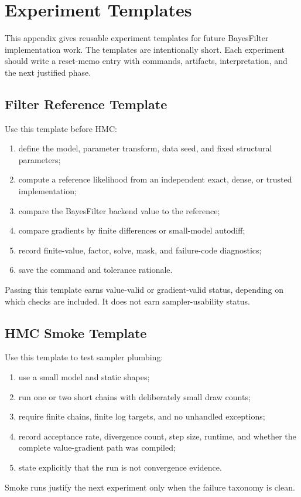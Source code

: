 \chapter{Experiment Templates}
\label{app:bf-experiment-templates}

This appendix gives reusable experiment templates for future BayesFilter
implementation work.  The templates are intentionally short.  Each experiment
should write a reset-memo entry with commands, artifacts, interpretation, and
the next justified phase.

\section{Filter Reference Template}
\label{sec:bf-filter-reference-template}

Use this template before HMC:
\begin{enumerate}[label=(\roman*)]
  \item define the model, parameter transform, data seed, and fixed structural
    parameters;
  \item compute a reference likelihood from an independent exact, dense, or
    trusted implementation;
  \item compare the BayesFilter backend value to the reference;
  \item compare gradients by finite differences or small-model autodiff;
  \item record finite-value, factor, solve, mask, and failure-code diagnostics;
  \item save the command and tolerance rationale.
\end{enumerate}
Passing this template earns value-valid or gradient-valid status, depending on
which checks are included.  It does not earn sampler-usability status.

\section{HMC Smoke Template}
\label{sec:bf-hmc-smoke-template}

Use this template to test sampler plumbing:
\begin{enumerate}[label=(\roman*)]
  \item use a small model and static shapes;
  \item run one or two short chains with deliberately small draw counts;
  \item require finite chains, finite log targets, and no unhandled exceptions;
  \item record acceptance rate, divergence count, step size, runtime, and
    whether the complete value-gradient path was compiled;
  \item state explicitly that the run is not convergence evidence.
\end{enumerate}
Smoke runs justify the next experiment only when the failure taxonomy is clean.

